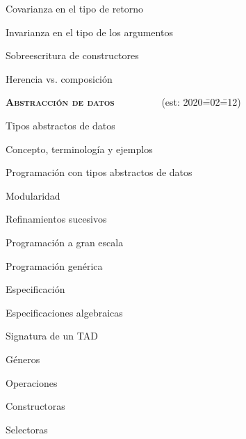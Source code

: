 \begin{longenum}
\begin{longenum}
\begin{longenum}
            \begin{longenum}
                \item Covarianza en el tipo de retorno
                \item Invarianza en el tipo de los argumentos
            \end{longenum}
            \item Sobreescritura de constructores
        \end{longenum}
        \item Herencia vs. composición
    \end{longenum}
    \item \textbf{\textsc{Abstracción de datos}} \ \ \ \ \ \ \ \ \ (est: 2020\==02\==12)
    \begin{longenum}
        \item Tipos abstractos de datos
        \begin{longenum}
            \item Concepto, terminología y ejemplos
            \item Programación con tipos abstractos de datos
            \begin{longenum}
                \item Modularidad
                \item Refinamientos sucesivos
                \item Programación a gran escala
                \item Programación genérica
            \end{longenum}
        \end{longenum}
        \item Especificación
        \begin{longenum}
            \item Especificaciones algebraicas
            \begin{longenum}
                \item Signatura de un TAD
                \begin{longenum}
                    \item Géneros
                    \item Operaciones
                    \begin{longenum}
                        \item Constructoras
                        \item Selectoras
                    \end{longenum}

\end{longenum}
\end{longenum}
\end{longenum}
\end{longenum}
\end{longenum}
